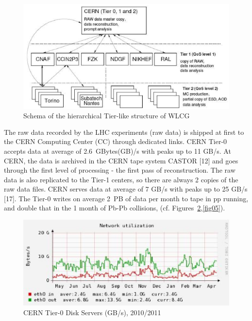 \begin{figure}[htb] %
\centering
\includegraphics[width=13cm]{fig03.eps} %
\caption{Schema of the hierarchical Tier-like structure of
WLCG}\label{fig03}
\end{figure}




The raw data recorded by the LHC experiments (raw data) is shipped
at first to the CERN Computing Center (CC) through dedicated links.
CERN Tier-0 accepts data at average of 2.6~GBytes(GB)/s with peaks
up to 11 GB/s. At CERN, the data is archived in the CERN tape system
CASTOR [12] and goes through the first level of processing - the
first pass of reconstruction. The raw data is also replicated to the
Tier-1 centers, so there are always 2 copies of the raw data files.
CERN serves data at average of 7 GB/s with peaks up to 25 GB/s [17].
The Tier-0 writes on average 2~PB of data per month to tape in pp
running, and double that in the 1 month of Pb-Pb collisions, (cf.
Figures~\ref{fig04},\ref{fig05}).


\begin{figure}[htb] %
\centering
\includegraphics[width=13cm]{fig04.eps} %
\caption{CERN Tier-0 Disk Servers (GB/s), 2010/2011}\label{fig04}
\end{figure}



